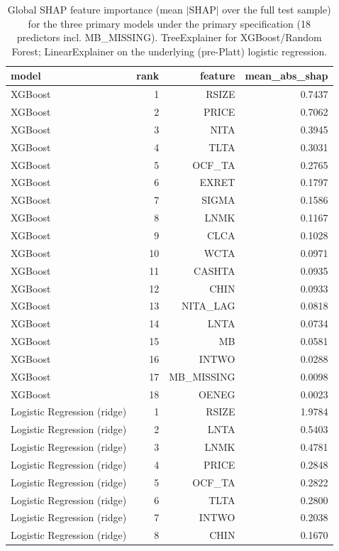 \begin{table}[htbp]
\centering
\caption{Global SHAP feature importance (mean $|$SHAP$|$ over the full test sample) for the three primary models under the primary specification (18 predictors incl. MB\_MISSING). TreeExplainer for XGBoost/Random Forest; LinearExplainer on the underlying (pre-Platt) logistic regression.}
\label{tab:v2_shap_importance}
\small
\begin{tabular}{lrrr}
\toprule
model & rank & feature & mean\_abs\_shap \\
\midrule
XGBoost & 1 & RSIZE & 0.7437 \\
XGBoost & 2 & PRICE & 0.7062 \\
XGBoost & 3 & NITA & 0.3945 \\
XGBoost & 4 & TLTA & 0.3031 \\
XGBoost & 5 & OCF\_TA & 0.2765 \\
XGBoost & 6 & EXRET & 0.1797 \\
XGBoost & 7 & SIGMA & 0.1586 \\
XGBoost & 8 & LNMK & 0.1167 \\
XGBoost & 9 & CLCA & 0.1028 \\
XGBoost & 10 & WCTA & 0.0971 \\
XGBoost & 11 & CASHTA & 0.0935 \\
XGBoost & 12 & CHIN & 0.0933 \\
XGBoost & 13 & NITA\_LAG & 0.0818 \\
XGBoost & 14 & LNTA & 0.0734 \\
XGBoost & 15 & MB & 0.0581 \\
XGBoost & 16 & INTWO & 0.0288 \\
XGBoost & 17 & MB\_MISSING & 0.0098 \\
XGBoost & 18 & OENEG & 0.0023 \\
Logistic Regression (ridge) & 1 & RSIZE & 1.9784 \\
Logistic Regression (ridge) & 2 & LNTA & 0.5403 \\
Logistic Regression (ridge) & 3 & LNMK & 0.4781 \\
Logistic Regression (ridge) & 4 & PRICE & 0.2848 \\
Logistic Regression (ridge) & 5 & OCF\_TA & 0.2822 \\
Logistic Regression (ridge) & 6 & TLTA & 0.2800 \\
Logistic Regression (ridge) & 7 & INTWO & 0.2038 \\
Logistic Regression (ridge) & 8 & CHIN & 0.1670 \\

\end{tabular}
\end{table}
